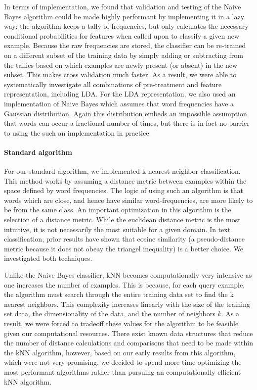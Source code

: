 \documentclass[conference,letterpaper]{IEEEtran}
\begin{document}
In terms of implementation, we found that validation and testing of the Naive 
Bayes algorithm could be made highly performant by implementing it in a 
lazy way: the algorithm keeps a tally of frequencies, but only calculates 
the necessary conditional probabilities for features when called upon to
classify a given new example.  Because the raw frequencies are stored,
the classifier can be re-trained on a different subset of the training data
by simply adding or subtracting from the tallies based on which examples are
newly present (or absent) in the new subset.  This makes cross validation much
faster.  As a result, we were able to systematically investigate all 
combinations of pre-treatment and feature representation, including LDA.
For the LDA representation, we also used an implementation of Naive Bayes 
which assumes that word frequencies have a Gaussian distribution.  Again
this distribution embeds an impossible assumption that words can occur a 
fractional number of times, but there is in fact no barrier to using the 
such an implementation in practice.

\paragraph{Standard algorithm}
For our standard algorithm, we implemented k-nearest neighbor classification.
This method works by assuming a distance metric between examples within the
space defined by word frequencies.  The logic of using such an algorithm is 
that words which are close, and hence have similar word-frequencies, are more
likely to be from the same class.  An important optimization in this 
algorithm is the selection of a distance metric.  While the euclidean distance
metric is the most intuitive, it is not necessarily the most suitable for
a given domain.  In text classification, prior results have shown that 
cosine similarity (a pseudo-distance metric because it does not obeay the
triangel inequality) is a better choice.  We investigated both techniques.

Unlike the Naive Bayes classifier, kNN becomes computationally very intensive
as one increases the number of examples.  This is because, for each query
example, the algorithm must search through the entire training data set to
find the k nearest neighbors.  This complexity increases linearly with the
size of the training set data, the dimensionality of the data, and the 
number of neighbors $k$.  As a result, we were forced to tradeoff these values
for the algorithm to be feasible given our computational resources.  There
exist known data structures that reduce the number of distance calculations and
comparisons that need to be made within the kNN algorithm, however, based on
our early results from this algorithm, which were not very promising, we 
decided to spend more time optimizing the most performant algorithms rather
than pursuing an computationally efficient kNN algorithm.
\end{document}
